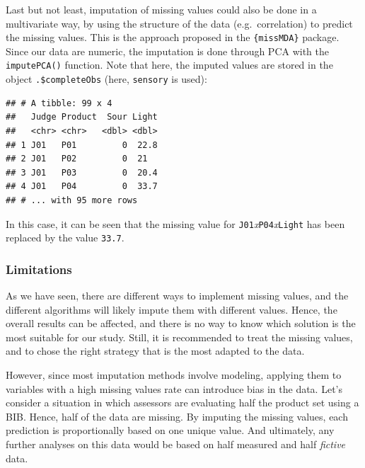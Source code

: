 \documentclass[
]{krantz}
\makeatletter
\newenvironment{Shaded}{\begin{snugshade}}{\end{snugshade}}
\newcommand{\AttributeTok}[1]{\textcolor[rgb]{0.61,0.61,0.61}{#1}}
\newcommand{\DecValTok}[1]{\textcolor[rgb]{0.06,0.06,0.06}{#1}}
\newcommand{\FunctionTok}[1]{\textcolor[rgb]{0,0,0}{#1}}
\newcommand{\NormalTok}[1]{#1}
\newcommand{\SpecialCharTok}[1]{\textcolor[rgb]{0,0,0}{#1}}
\newcommand{\StringTok}[1]{\textcolor[rgb]{0.5,0.5,0.5}{#1}}
\newenvironment{kframe}{%
\medskip{}
\setlength{\fboxsep}{.8em}
 \def\at@end@of@kframe{}%
 \ifinner\ifhmode%
  \def\at@end@of@kframe{\end{minipage}}%
  \begin{minipage}{\columnwidth}%
 \fi\fi%
 \def\FrameCommand##1{\hskip\@totalleftmargin \hskip-\fboxsep
 \colorbox{shadecolor}{##1}\hskip-\fboxsep
     \hskip-\linewidth \hskip-\@totalleftmargin \hskip\columnwidth}%
 \MakeFramed {\advance\hsize-\width
   \@totalleftmargin\z@ \linewidth\hsize
   \@setminipage}}%
 {\par\unskip\endMakeFramed%
 \at@end@of@kframe}
\renewenvironment{Shaded}{\begin{kframe}}{\end{kframe}}
\makeatother
\begin{document}
Last but not least, imputation of missing values could also be done in a multivariate way, by using the structure of the data (e.g.~correlation) to predict the missing values. This is the approach proposed in the \texttt{\{missMDA\}} package. Since our data are numeric, the imputation is done through PCA with the \texttt{imputePCA()} function. Note that here, the imputed values are stored in the object \texttt{.\$completeObs} (here, \texttt{sensory} is used):

\begin{Shaded}
\end{Shaded}

\begin{verbatim}
## # A tibble: 99 x 4
##   Judge Product  Sour Light
##   <chr> <chr>   <dbl> <dbl>
## 1 J01   P01         0  22.8
## 2 J01   P02         0  21  
## 3 J01   P03         0  20.4
## 4 J01   P04         0  33.7
## # ... with 95 more rows
\end{verbatim}

In this case, it can be seen that the missing value for \texttt{J01}\emph{x}\texttt{P04}\emph{x}\texttt{Light} has been replaced by the value \texttt{33.7}.

\hypertarget{limitations}{%
\subsubsection{Limitations}\label{limitations}}

As we have seen, there are different ways to implement missing values, and the different algorithms will likely impute them with different values. Hence, the overall results can be affected, and there is no way to know which solution is the most suitable for our study. Still, it is recommended to treat the missing values, and to chose the right strategy that is the most adapted to the data.

However, since most imputation methods involve modeling, applying them to variables with a high missing values rate can introduce bias in the data. Let's consider a situation in which assessors are evaluating half the product set using a BIB. Hence, half of the data are missing. By imputing the missing values, each prediction is proportionally based on one unique value. And ultimately, any further analyses on this data would be based on half measured and half \emph{fictive} data.
\end{document}
